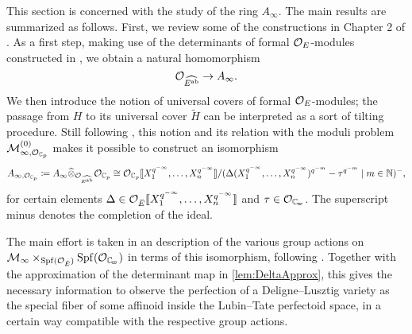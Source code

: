 \documentclass[../main.tex]{subfiles}
\begin{document}
This section is concerned with the study of the ring $A_\infty$. 
The main results are summarized as follows. 
First, we review some of the constructions in Chapter 2 of
\cite{weinstein2016semistable}. As a first step, making use of the determinants
of formal $\mathcal{O}_E$-modules constructed in \cite{hedayatzadeh2015det}, we obtain
a natural homomorphism
\begin{equation*}
   \mathcal{O}_{\widehat{E^{\mathrm{ab}}}} \to  A_\infty.
\end{equation*}
We then introduce the notion of universal covers of formal $\mathcal{O}_E$-modules; the 
passage from $H$ to its universal cover $\tilde H$ can be interpreted as a sort
of tilting procedure. Still following \cite{weinstein2016semistable}, this
notion and its relation with the moduli problem $\mathcal{M}_{\infty,
\mathcal{O}_{\mathbb{C}_p}}^{(0)}$ makes it possible to construct an isomorphism
\begin{equation}\label{eq:ExplicitAinftyBCtoOC}
  A_{\infty, \mathcal{O}_{\mathbb{C}_p}} \coloneq A_\infty \widehat \otimes_{\mathcal{O}_{\widehat{E^{\mathrm{ab}}}}}
  \mathcal{O}_{\mathbb{C}_p} 
  \cong \mathcal{O}_{\mathbb{C}_p} \llbracket X_1^{q^{-\infty}}, \dots, X_n^{q^{-\infty}} \rrbracket /
  (\Delta(X_1^{q^{-\infty}}, \dots, X_n^{q^{-\infty}})^{q^{-m}} - \tau^{q^{-m}} \mid 
  m \in \mathbb{N})^- ,
\end{equation}
for certain elements $\Delta \in \mathcal{O}_{{\breve {E}}} \llbracket X_1^{q^{-\infty}}, \dots,
X_n^{q^{-\infty}}\rrbracket$ and $\tau \in \cO_\Cp$. The superscript minus denotes
the completion of the ideal.

The main effort is taken in an description of the various group actions on
$\cM_\infty \times_{\Spf(\cO_\br E)} \Spf(\cO_\Cp)$ in terms of this
isomorphism, following \cite[Section 1.2]{imaitsushima2020affinoids}.
Together with the approximation of the determinant map in 
\cref{lem:DeltaApprox}, this gives the necessary information to observe the
perfection of a Deligne--Lusztig variety as the special fiber of some affinoid
inside the Lubin--Tate perfectoid space, in a certain way compatible with the
respective group actions. 

\end{document}
